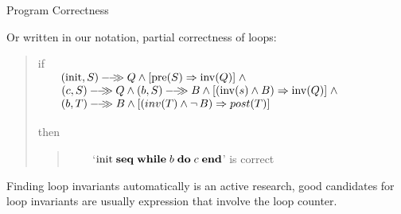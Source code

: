 \documentclass{beamer}
\begin{document}
\begin{frame}[fragile]{Program Correctness}

\small

Or written in our notation, partial correctness of loops:
\begin{quote}
if\\
{\verb"    "}${({\rm init},S)}-\!\!-\!\!\!\!\gg{Q} \wedge [{\rm pre}(S)\Rightarrow {\rm inv}(Q)]\; \wedge$\\ 
{\verb"    "}$\sem{(c,S)}{Q} \wedge \sem{(b,S)}{B} \wedge [({\rm inv}(s) \wedge B)\Rightarrow {\rm inv}(Q)]\; \wedge$\\
{\verb"    "}${(b,T)}-\!\!-\!\!\!\!\gg{B} \wedge [(inv(T) \wedge \neg\,B) \Rightarrow post(T)]$\\
{\verb"    "}\\
then 
\begin{quote}
{\verb"    "}`${\rm init}\; {\bf seq}\; {\bf while}\; {b}\;{\bf do}\;{c}\; \mbox{\bf end}$'  is correct\\
\end{quote}
\end{quote}


\vspace{.2in}
Finding loop invariants automatically  is an active research, good candidates for loop invariants are usually expression
that involve the loop counter.
\end{frame}
\end{document}
